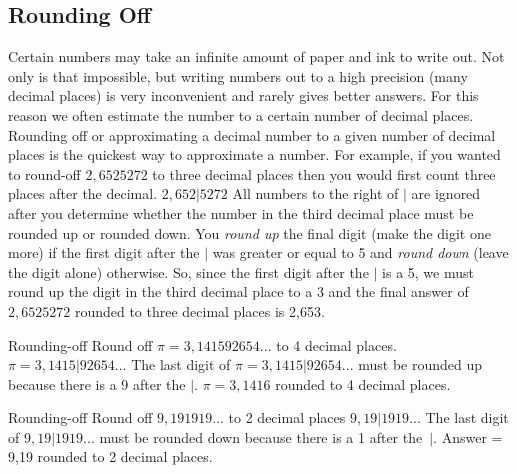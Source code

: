             \subsection*{Rounding Off}
            \nopagebreak
        \label{m30853*id63743}Certain numbers may take an infinite amount of paper and ink to write out. Not only is that impossible, but writing numbers out to a high precision (many decimal places) is very inconvenient and rarely gives better answers. For this reason we often estimate the number to a certain number of decimal places.
Rounding off or approximating a decimal number to a given number of decimal places is the quickest way to approximate a number. For example, if you wanted to round-off $2,6525272$ to three decimal places then you would first count three places after the decimal.
$2,652|5272$
All numbers to the right of $|$ are ignored after you determine whether the number in the third decimal place must be rounded up or rounded down. You \textsl{round up} the final digit (make the digit one more) if the first digit after the $|$ was greater or equal to 5 and \textsl{round down} (leave the digit alone) otherwise.
So, since the first digit after the $|$ is a 5, we must round up the digit in the third decimal place to a 3 and the final answer of $2,6525272$ rounded to three decimal places is 2,653.\par 
\label{m30853*secfhsst!!!underscore!!!id320}\vspace{.5cm} 
      \noindent
\begin{wex}{Rounding-off }{
        \label{m30853*probfhsst!!!underscore!!!id321}
        \label{m30853*id63850}Round off $\pi =3,141592654...$ to 4 decimal places. 
        \vspace{5pt}}
{
          $\pi =3,1415|92654...$
        The last digit of $\pi =3,1415|92654...$ must be rounded up because there is a 9 after the $|$.
        $\pi =3,1416$ rounded to 4 decimal places. 
    }
\end{wex}
    \noindent
\label{m30853*secfhsst!!!underscore!!!id346}\vspace{.5cm} 
      \noindent
\begin{wex}{Rounding-off }{
Round off $9,191919...$ to 2 decimal places 
        \vspace{5pt} }
{ 
          $9,19|1919...$
The last digit of $9,19|1919...$ must be rounded down because there is a 1 after the~$|$.
Answer = 9,19 rounded to 2 decimal places. 
    }
\end{wex}
    \noindent
      \label{m30853*uid17}

